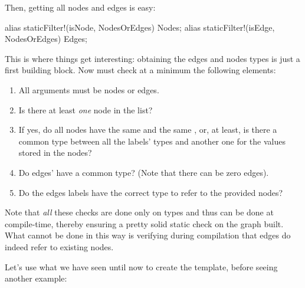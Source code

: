 Then, getting all nodes and edges is easy:
\begin{dcode}
alias staticFilter!(isNode, NodesOrEdges) Nodes;
alias staticFilter!(isEdge, NodesOrEdges) Edges;
\end{dcode}

This is where things get interesting: obtaining the edges and nodes types is just a first building block. Now  must check at a minimum the following elements:

\begin{enumerate}
\item All arguments must be nodes or edges.
\item Is there at least \emph{one} node in the list?
\item If yes, do all nodes have the same  and the same , or, at least, is there a common type between all the labels' types and another one for the values stored in the nodes?
\item Do edges'  have a common type? (Note that there can be zero edges).
\item Do the edges labels have the correct type to refer to the provided nodes?
\end{enumerate}

Note that \emph{all} these checks are done only on types and thus can be done at compile-time, thereby ensuring a pretty solid static check on the graph built. What cannot be done in this way is verifying during compilation that edges do indeed refer to existing nodes.

Let's use what we have seen until now to create the \label{graphcheck} template, before seeing another  example:

